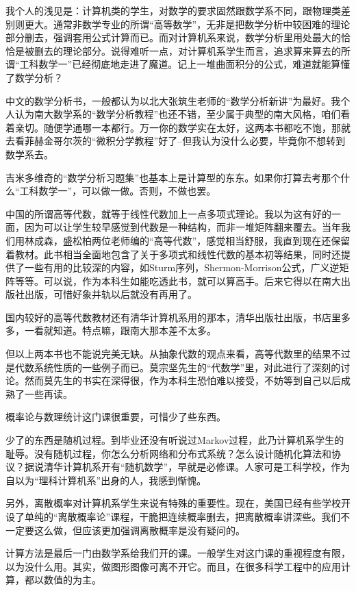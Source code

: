 我个人的浅见是：计算机类的学生，对数学的要求固然跟数学系不同，跟物理类差别则更大。通常非数学专业的所谓“高等数学”，无非是把数学分析中较困难的理论部分删去，强调套用公式计算而已。而对计算机系来说，数学分析里用处最大的恰恰是被删去的理论部分。说得难听一点，对计算机系学生而言，追求算来算去的所谓“工科数学一”已经彻底地走进了魔道。记上一堆曲面积分的公式，难道就能算懂了数学分析？ 

中文的数学分析书，一般都认为以北大张筑生老师的“数学分析新讲”为最好。我个人认为南大数学系的“数学分析教程”也还不错，至少属于典型的南大风格，咱们看着亲切。随便学通哪一本都行。万一你的数学实在太好，这两本书都吃不饱，那就去看菲赫金哥尔茨的“微积分学教程”好了--但我认为没什么必要，毕竟你不想转到数学系去。 

吉米多维奇的“数学分析习题集”也基本上是计算型的东东。如果你打算去考那个什么“工科数学一”，可以做一做。否则，不做也罢。 

中国的所谓高等代数，就等于线性代数加上一点多项式理论。我以为这有好的一面，因为可以让学生较早感觉到代数是一种结构，而非一堆矩阵翻来覆去。当年我们用林成森，盛松柏两位老师编的“高等代数”，感觉相当舒服，我直到现在还保留着教材。此书相当全面地包含了关于多项式和线性代数的基本初等结果，同时还提供了一些有用的比较深的内容，如Sturm序列，Shermon-Morrison公式，广义逆矩阵等等。可以说，作为本科生如能吃透此书，就可以算高手。后来它得以在南大出版社出版，可惜好象并轨以后就没有再用了。 

国内较好的高等代数教材还有清华计算机系用的那本，清华出版社出版，书店里多多，一看就知道。特点嘛，跟南大那本差不太多。 

但以上两本书也不能说完美无缺。从抽象代数的观点来看，高等代数里的结果不过是代数系统性质的一些例子而已。莫宗坚先生的“代数学”里，对此进行了深刻的讨论。然而莫先生的书实在深得很，作为本科生恐怕难以接受，不妨等到自己以后成熟了一些再读。 

概率论与数理统计这门课很重要，可惜少了些东西。 

少了的东西是随机过程。到毕业还没有听说过Markov过程，此乃计算机系学生的耻辱。没有随机过程，你怎么分析网络和分布式系统？怎么设计随机化算法和协议？据说清华计算机系开有“随机数学”，早就是必修课。人家可是工科学校，作为自以为“理科计算机系”出身的人，我感到惭愧。 

另外，离散概率对计算机系学生来说有特殊的重要性。现在，美国已经有些学校开设了单纯的“离散概率论”课程，干脆把连续概率删去，把离散概率讲深些。我们不一定要这么做，但应该更加强调离散概率是没有疑问的。 

计算方法是最后一门由数学系给我们开的课。一般学生对这门课的重视程度有限，以为没什么用。其实，做图形图像可离不开它。而且，在很多科学工程中的应用计算，都以数值的为主。 

